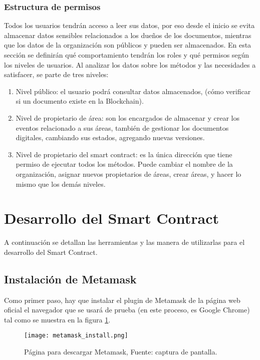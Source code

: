   \subsubsection{Estructura de permisos}
  Todos los usuarios tendrán acceso a leer sus datos, por eso desde el inicio   se evita almacenar datos sensibles relacionados
  a los dueños de los documentos, mientras que los datos de la organización son públicos y pueden ser almacenados. 
  En esta sección se definirán qué comportamiento tendrán los roles y qué permisos según los niveles de usuarios. Al analizar los datos sobre los métodos y las necesidades 
  a satisfacer, se parte de tres niveles: 
  \begin{enumerate}
    \item Nivel público: el usuario podrá consultar datos almacenados, (cómo verificar si un documento existe en la Blockchain).
    \item Nivel de propietario de área: son los encargados de almacenar y crear los eventos relacionado a sus áreas, también de gestionar los documentos digitales, cambiando sus estados,
    agregando nuevas versiones.
    \item Nivel de propietario del smart contract: es la única dirección que tiene permiso de ejecutar todos los métodos. Puede cambiar el nombre de la organización,
    asignar nuevos propietarios de áreas, crear áreas, y hacer lo mismo que los demás niveles. 
  \end{enumerate}
  


\section{Desarrollo del Smart Contract}
A continuación se detallan las herramientas y las manera de utilizarlas para el desarrollo 
del Smart Contract.

\subsection{Instalación de Metamask}

Como primer paso, hay que instalar el plugin de Metamask de la  página web oficial   el navegador que se usará de prueba (en este proceso, es  Google Chrome) 
tal como se muestra en la  figura \ref{img:metamask_install}.
\begin{figure}[H]
  \centering
  {\texttt{[image: metamask\_install.png]}}
  \caption{Página para descargar Metamask, Fuente: captura de pantalla.}
  \label{img:metamask_install}
\end{figure}

